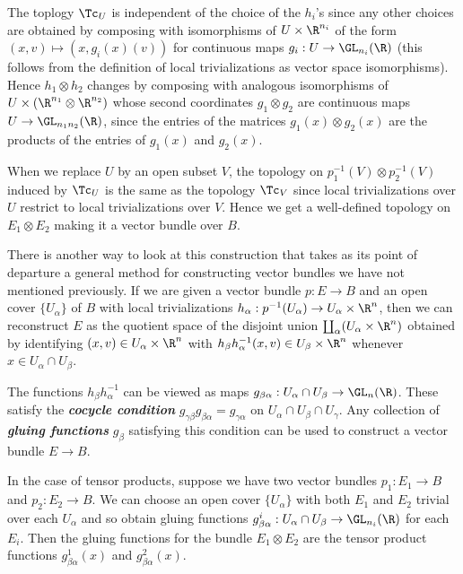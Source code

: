 \begin{defn}
\begin{itemize}
		The toplogy $\Tc_U$ is independent of the choice of the $h_i$'s since any other choices are obtained by composing with isomorphisms of $U\times\R^{n_i}$ of the form $(x,v)\mapsto(x,g_i(x)(v))$ for continuous maps $g_i:U\to \GL_{n_i}(\R)$ {\color{cyan}(this follows from the definition of local trivializations as vector space isomorphisms)}. Hence $h_1\otimes h_2$ changes by composing with analogous isomorphisms of $U\times (\R^{n_1}\otimes\R^{n_2})$ whose second coordinates $g_1\otimes g_2$ are continuous maps $U\to\GL_{n_1n_2}(\R)$, since the entries of the matrices $g_1(x)\otimes g_2(x)$ are the products of the entries of $g_1(x)$ and $g_2(x)$.
		
		When we replace $U$ by an open subset $V$, the topology on $p_1^{-1}(V)\otimes p_2^{-1}(V)$ induced by $\Tc_U$ is the same as the topology $\Tc_V$ since local trivializations over $U$ restrict to local trivializations over $V$. Hence we get a well-defined topology on $E_1\otimes E_2$ making it a vector bundle over $B$.
	\end{itemize}
\end{defn}
\begin{remark}
	There is another way to look at this construction that takes as its point of departure a general method for constructing vector bundles we have not mentioned previously. If we are given a vector bundle $p:E\to B$ and an open cover $\{U_\alpha\}$ of $B$ with local trivializations $h_\alpha:p^{-1}(U_\alpha)\to U_\alpha\times\R^n$, then we can reconstruct $E$ as the quotient space of the disjoint union $\coprod_\alpha(U_\alpha\times\R^n)$ obtained by identifying $(x,v)\in U_\alpha\times\R^n$ with $h_\beta h_\alpha^{-1}(x,v)\in U_\beta\times\R^n$ whenever $x\in U_\alpha\cap U_\beta$.
	
	The functions $h_\beta h_\alpha^{-1}$ can be viewed as maps $g_{\beta\alpha}:U_\alpha\cap U_\beta\to \GL_n(\R)$. These satisfy the \textbf{\textit{cocycle condition}}\label{cocycle-condition} $g_{\gamma\beta}g_{\beta\alpha}=g_{\gamma\alpha}$ on $U_\alpha\cap U_\beta\cap U_\gamma$. Any collection of \textbf{\textit{gluing functions}} $g_{\beta}$ satisfying this condition can be used to construct a vector bundle $E\to B$.
	
	In the case of tensor products, suppose we have two vector bundles $p_1:E_1\to B$ and $p_2:E_2\to B$. We can choose an open cover $\{U_\alpha\}$ with both $E_1$ and $E_2$ trivial over each $U_\alpha$ and so obtain gluing functions $g_{\beta\alpha}^i:U_\alpha\cap U_\beta\to\GL_{n_i}(\R)$ for each $E_i$. Then the gluing functions for the bundle $E_1\otimes E_2$ are the tensor product functions $g_{\beta\alpha}^1(x)$ and $g_{\beta\alpha}^2(x)$.
\end{remark}
